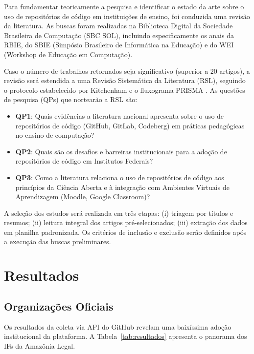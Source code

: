 \documentclass[english, spanish, brazilian]{RBIEarticle}
\begin{document}
Para fundamentar teoricamente a pesquisa e identificar o estado da arte sobre o uso de repositórios de código em instituições de ensino, foi conduzida uma revisão da literatura. As buscas foram realizadas na Biblioteca Digital da Sociedade Brasileira de Computação (SBC SOL), incluindo especificamente os anais da RBIE, do SBIE (Simpósio Brasileiro de Informática na Educação) e do WEI (Workshop de Educação em Computação).

Caso o número de trabalhos retornados seja significativo (superior a 20 artigos), a revisão será estendida a uma Revisão Sistemática da Literatura (RSL), seguindo o protocolo estabelecido por Kitchenham \cite{kitchenham2004} e o fluxograma PRISMA \cite{page2021prisma}. As questões de pesquisa (QPs) que nortearão a RSL são:

\begin{itemize}
    \item \textbf{QP1}: Quais evidências a literatura nacional apresenta sobre o uso de repositórios de código (GitHub, GitLab, Codeberg) em práticas pedagógicas no ensino de computação?
    \item \textbf{QP2}: Quais são os desafios e barreiras institucionais para a adoção de repositórios de código em Institutos Federais?
    \item \textbf{QP3}: Como a literatura relaciona o uso de repositórios de código aos princípios da Ciência Aberta e à integração com Ambientes Virtuais de Aprendizagem (Moodle, Google Classroom)?
\end{itemize}

A seleção dos estudos será realizada em três etapas: (i) triagem por títulos e resumos; (ii) leitura integral dos artigos pré-selecionados; (iii) extração dos dados em planilha padronizada. Os critérios de inclusão e exclusão serão definidos após a execução das buscas preliminares.

\section{Resultados}
\subsection{Organizações Oficiais}

Os resultados da coleta via API do GitHub revelam uma baixíssima adoção institucional da plataforma. A Tabela~\ref{tab:resultados} apresenta o panorama dos IFs da Amazônia Legal.
\end{document}
